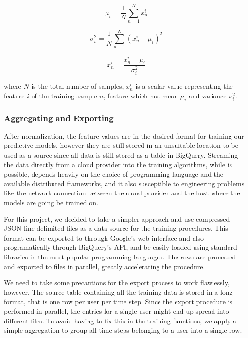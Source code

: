 \documentclass{kththesis}
\begin{document}
 \begin{equation}
 \mu_i = \frac{1}{N}\sum_{n=1}^{N}x_n^i
 \end{equation}

\begin{equation}
\sigma_i^2 = \frac{1}{N}\sum_{n=1}^{N}(x_n^i - \mu_i)^2
\end{equation}
 
\begin{equation}
x_n^i = \frac{x_n^i - \mu_i}{\sigma_i^2}
\end{equation}

where $N$ is the total number of samples, $x_n^i$ is a scalar value representing the feature $i$ of the training sample $n$, feature which has mean $\mu_i$ and variance $\sigma^2_i$.

\subsubsection{Aggregating and Exporting}

After normalization, the feature values are in the desired format for training our predictive models, however they are still stored in an unsuitable location to be used as a source since all data is still stored as a table in BigQuery. Streaming the data directly from a cloud provider into the training algorithms, while is possible, depends heavily on the choice of programming language and the available distributed frameworks, and it also susceptible to engineering problems like the network connection between the cloud provider and the host where the models are going be trained on.

For this project, we decided to take a simpler approach and use compressed JSON line-delimited files as a data source for the training procedures. This format can be exported to through Google's web interface and also programatically through BigQuery's API, and be easily loaded using standard libraries in the most popular programming languages. The rows are processed and exported to files in parallel, greatly accelerating the procedure.

We need to take some precautions for the export process to work flawlessly, however. The source table containing all the training data is stored in a long format, that is one row per user per time step. Since the export procedure is performed in parallel, the entries for a single user might end up spread into different files. To avoid having to fix this in the training functions, we apply a simple aggregation to group all time steps belonging to a user into a single row.
\end{document}
